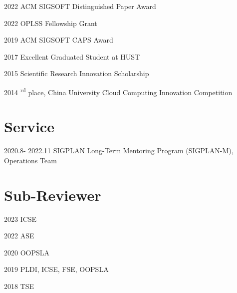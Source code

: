 \documentclass[12pt,letterpaper]{report}
\begin{document}
\begin{tablist}
	\item[2022] \tab ACM SIGSOFT Distinguished Paper Award
	\item[2022] \tab OPLSS Fellowship Grant
	\item[2019] \tab ACM SIGSOFT CAPS Award
	\item[2017] \tab Excellent Graduated Student at HUST
	\item[2015] \tab Scientific Research Innovation Scholarship
	\item[2014] \textsuperscript{rd} place, China University Cloud Computing Innovation Competition
\end{tablist}


\vspace{-0.5em}
\section*{Service}
\begin{tablist}[style=multiline, leftmargin=*]
	\item[2020.8- 2022.11] \tab SIGPLAN Long-Term Mentoring Program (SIGPLAN-M), Operations Team
\end{tablist}

\section*{Sub-Reviewer}
\begin{tablist}
	\item[2023] \tab ICSE
	\item[2022] \tab ASE
	\item[2020] \tab OOPSLA
	\item[2019] \tab PLDI, ICSE, FSE, OOPSLA
	\item[2018] \tab TSE
\end{tablist}
\end{document}
